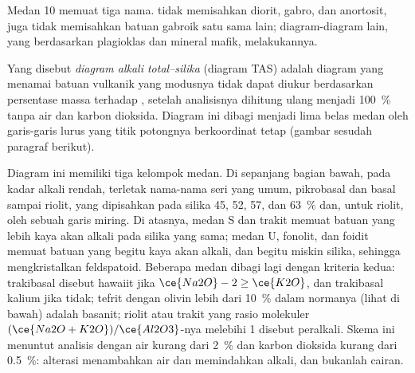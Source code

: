 \begin{omfigure}
\par{}
\end{omfigure}

Medan 10 memuat tiga nama.  tidak memisahkan diorit, gabro, dan
anortosit, juga tidak memisahkan batuan gabroik satu sama lain; diagram-diagram lain, yang berdasarkan
plagioklas dan mineral mafik, melakukannya.

\begin{definition}\label{def:b2:magmatic-series:tas}
Yang disebut \emph{diagram alkali total--silika} (diagram
TAS) adalah diagram yang menamai batuan vulkanik yang modusnya tidak dapat diukur berdasarkan persentase
massa  terhadap , setelah analisisnya dihitung
ulang menjadi \qty{100}{\percent} tanpa air dan karbon dioksida. Diagram ini dibagi
menjadi lima belas medan oleh garis-garis lurus yang titik potongnya berkoordinat tetap
(gambar sesudah paragraf berikut).
\end{definition}

Diagram ini memiliki tiga kelompok medan. Di sepanjang bagian bawah, pada kadar alkali rendah, terletak
nama-nama seri yang umum, pikrobasal dan basal sampai riolit, yang dipisahkan pada silika 45, 52,
57, dan \qty{63}{\percent} dan, untuk riolit, oleh sebuah garis miring. Di atasnya, medan S dan trakit memuat batuan yang lebih kaya akan
alkali pada silika yang sama; medan U, fonolit, dan foidit memuat batuan yang begitu kaya akan
alkali, dan begitu miskin silika, sehingga mengkristalkan feldspatoid. Beberapa medan
dibagi lagi dengan kriteria kedua: trakibasal disebut hawaiit jika $\ce{Na2O} - 2
\ge \ce{K2O}$, dan trakibasal kalium jika tidak; tefrit dengan olivin lebih dari
\qty{10}{\percent} dalam normanya (lihat di bawah) adalah basanit; riolit atau trakit yang
rasio molekuler $(\ce{Na2O + K2O})/\ce{Al2O3}$-nya melebihi 1 disebut peralkali. Skema ini
menuntut analisis dengan air kurang dari \qty{2}{\percent} dan karbon dioksida kurang dari \qty{0.5}{\percent}:
alterasi menambahkan air dan memindahkan alkali, dan  bukanlah
cairan.


